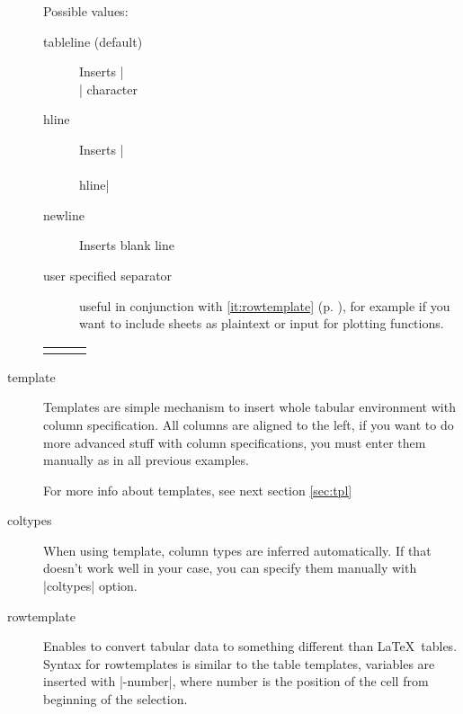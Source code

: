 \documentclass{ltxdoc}
\begin{document}
\begin{description}
Possible values:
\begin{description}
\item[tableline (default)] Inserts |\\| character
\item[hline] Inserts |\\ \\hline| 
\item[newline] Inserts blank line
\item[user specified separator] useful in conjunction with \ref{it:rowtemplate} 
(p. \pageref{it:rowtemplate}), for example if you want to include sheets 
as plaintext or input for plotting functions.  
\end{description} 
\begin{LTXexample}
\begin{tabular}{lll}
\end{tabular}     
\end{LTXexample} 

\item[template] Templates are simple mechanism to insert whole tabular environment with column specification. All columns are aligned to the left, if you want to do more advanced stuff with column specifications, you must enter them manually as in all previous examples.
\begin{LTXexample}
\end{LTXexample}
For more info about templates, see next section \ref{sec:tpl}

\item[coltypes] When using template, column types are inferred automatically. If that doesn't work well in your case, you can specify them manually with |coltypes| option.

  \begin{LTXexample}
  \end{LTXexample}

\item[rowtemplate] 
\makeatletter
\edef\@currentlabel{rowtemplate}
\label{it:rowtemplate} Enables to convert tabular data to something different than \LaTeX\ tables. 
Syntax for rowtemplates is similar to the table templates, variables are inserted with |-{number}|, where 
number is the position of the cell from beginning of the selection. 
\makeatother
\begin{LTXexample}
\end{LTXexample}
\end{description} 
\end{document}
